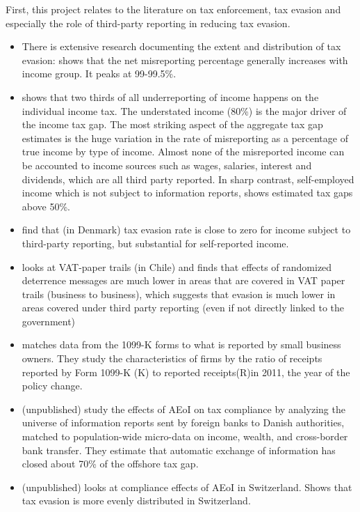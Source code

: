 \documentclass[12pt]{article}
\begin{document}
First, this project relates to the literature on tax enforcement, tax evasion and especially the role of third-party reporting in reducing tax evasion. 
\begin{itemize}
    \item There is extensive research documenting the extent and distribution of tax evasion:  \textcite{johns2010distribution} shows that the net misreporting percentage generally increases with income group. It peaks at 99-99.5\%. 
    \item \textcite{slemrod2007cheating} shows that two thirds of all underreporting of income happens on the individual income tax. The understated income (80\%) is the major driver of the income tax gap. The most striking aspect of the aggregate tax gap estimates is the huge variation in the rate of misreporting as a percentage of true income by type of income. Almost none of the misreported income can be accounted to income sources such as wages, salaries, interest and dividends, which are all third party reported. In sharp contrast, self-employed income which is not subject to information reports, shows estimated tax gaps above 50\%. 
    \item \textcite{kleven2011unwilling} find that (in Denmark) tax evasion rate is close to zero for income subject to third-party reporting, but substantial for self-reported income. 
    \item \textcite{pomeranz2015no} looks at VAT-paper trails (in Chile) and finds that effects of randomized deterrence messages are much lower in areas that are covered in VAT paper trails (business to business), which suggests that evasion is much lower in areas covered under third party reporting (even if not directly linked to the government)
    \item \textcite{slemrod2017does} matches data from the 1099-K forms to what is reported by small business owners. They study the characteristics of firms by the ratio of receipts reported by Form 1099-K (K) to reported receipts(R)in 2011, the year of the policy change.
    \item \textcite{boas2024taxing} (unpublished) study the effects of AEoI on tax compliance by analyzing the universe of information reports sent by foreign banks to Danish authorities, matched to population-wide micro-data on income, wealth, and cross-border bank transfer. They estimate that automatic exchange of information has closed about 70\% of the offshore tax gap. 
    \item \textcite{baselgia2023compliance} (unpublished) looks at compliance effects of AEoI in Switzerland. Shows that tax evasion is more evenly distributed in Switzerland. 

\end{itemize}
\end{document}
